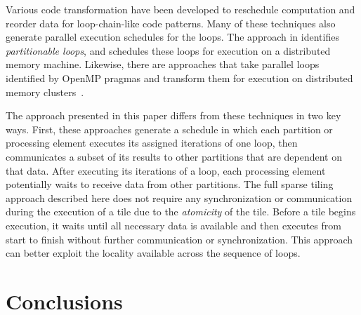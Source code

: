 Various code transformation have been developed to reschedule computation and reorder data for loop-chain-like code patterns. Many of these techniques also generate parallel execution schedules for the loops. The approach in \cite{ST-OhioStateMPICodeGen} identifies \emph{partitionable loops}, and schedules these loops for execution on a distributed memory machine. Likewise, there are approaches that take parallel loops identified by OpenMP pragmas and transform them for execution on distributed memory clusters~\citep{ST-Basumallik2006}. 

The approach presented in this paper differs from these techniques in two key ways. First, these approaches generate a schedule in which each partition or processing element executes its assigned iterations of one loop, then communicates a subset of its results to other partitions that are dependent on that data. After executing its iterations of a loop, each processing element potentially waits to receive data from other partitions. The full sparse tiling approach described here does not require any synchronization or communication during the execution of a tile due to the \emph{atomicity} of the tile. Before a tile begins execution, it waits until all necessary data is available and then executes from start to finish without further communication or synchronization. This approach can better exploit the locality available across the sequence of loops.



\section{Conclusions}
\label{sec:conclusions}

